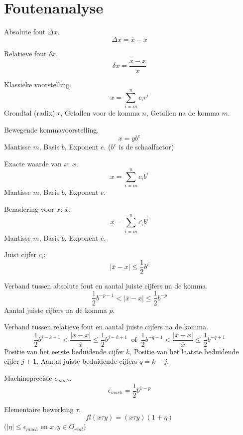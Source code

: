 \documentclass[samenvatting.tex]{subfiles}
\begin{document}
\chapter{Foutenanalyse}
\begin{defi}
Absolute fout $\Delta x$.
\[
\Delta x = \overline{x} - x
\]
\end{defi}
\begin{defi}
Relatieve fout $\delta x$.
\[
\delta x = \frac{\overline{x} - x}{x}
\]
\end{defi}
\begin{defi}
Klassieke voorstelling.
\[
x = \sum_{i=m}^nc_{i}r^{i}
\]
Grondtal (radix) $r$, Getallen voor de komma $n$, Getallen na de komma $m$.
\end{defi}
\begin{defi}
Bewegende kommavoorstelling.
\[
x = yb^e
\]
Mantisse $m$, Basis $b$, Exponent $e$. ($b^e$ is de schaalfactor)
\end{defi}
\begin{defi}
Exacte waarde van $x$: $x$.
\[
x = \sum_{i=m}^nc_{i}b^{i}
\]
Mantisse $m$, Basis $b$, Exponent $e$.
\end{defi}
\begin{defi}
Benadering voor $x$: $\overline{x}$.
\[
x = \sum_{i=m}^n\overline{c_{i}}b^{i}
\]
Mantisse $m$, Basis $b$, Exponent $e$.
\end{defi}
\begin{defi}
Juist cijfer $c_i$:
\[
|\overline{x}-x| \le \frac{1}{2}b^i
\]
\end{defi}
\begin{defi}
Verband tussen absolute fout en aantal juiste cijfers na de komma.
\[
\frac{1}{2}b^{-p-1} < |\overline{x}-x| \le \frac{1}{2}b^{-p}
\]
Aantal juiste cijfers na de komma $p$.
\end{defi}
\begin{defi}
Verband tussen relatieve fout en aantal juiste cijfers na de komma.
\[
\frac{1}{2}b^{j-k-1} < \frac{|\overline{x}-x|}{\overline{x}} \le \frac{1}{2}b^{j-k+1}
\ \text{ of }\ 
\frac{1}{2}b^{-q-1} < \frac{|\overline{x}-x|}{\overline{x}} \le \frac{1}{2}b^{-q+1}
\]
Positie van het eerste beduidende cijfer $k$, Positie van het laatste beduidende cijfer $j+1$, Aantal juiste beduidende cijfers $q=k-j$.
\end{defi}
\begin{defi}
Machineprecisie $\epsilon_{mach}$.
\[
\epsilon_{mach} = \frac{1}{2}b^{1-p}
\]
\end{defi}
\begin{defi}
Elementaire bewerking $\tau$.
\[
fl(x \tau y) = (x \tau y)(1 + \eta)
\]
$(|\eta| \le \epsilon_{mach}$ en $x,y \in O_{real})$
\end{defi}
\end{document}
